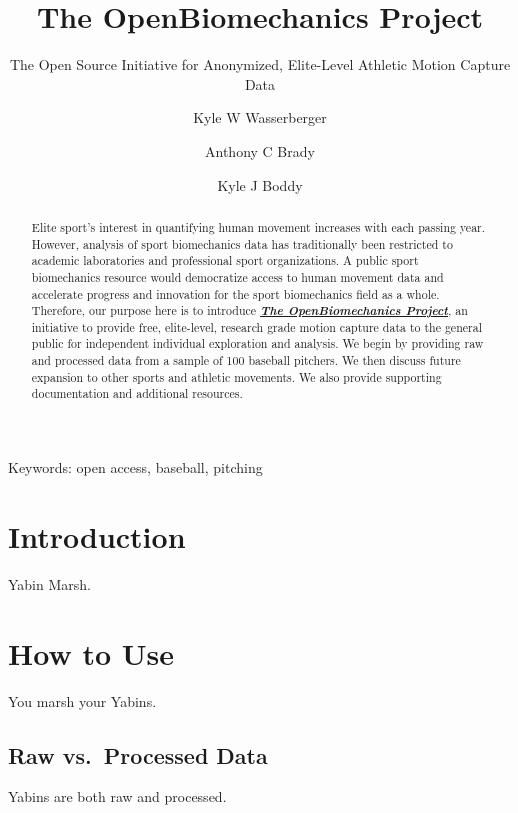 \documentclass[
]{article}
\author[1,$\dagger$]{\footnotesize Kyle W Wasserberger}
\author[1]{\footnotesize Anthony C Brady}
\author[1]{\footnotesize Kyle J Boddy}
\affil[1]{\footnotesize Research \& Development; Driveline Baseball}
\affil[$\dagger$]{\footnotesize Corresponding author: kyle.wasserberger@drivelinebaseball.com}
\title{The OpenBiomechanics Project}
\subtitle{The Open Source Initiative for Anonymized, Elite-Level Athletic Motion Capture Data}
\date{\vspace{-2.5em}}
\begin{document}
\maketitle

\begin{center}
Keywords: open access, baseball, pitching
\end{center}

\bigskip
\bigskip
\begin{abstract}
\doublespacing
Elite sport's interest in quantifying human movement increases with each passing year. However, analysis of sport biomechanics data has traditionally been restricted to academic laboratories and professional sport organizations. A public sport biomechanics resource would democratize access to human movement data and accelerate progress and innovation for the sport biomechanics field as a whole. Therefore, our purpose here is to introduce \href{www.openbiomechanics.org}{\textbf{\textit{The OpenBiomechanics Project}}}, an initiative to provide free, elite-level, research grade motion capture data to the general public for independent individual exploration and analysis. We begin by providing raw and processed data from a sample of 100 baseball pitchers. We then discuss future expansion to other sports and athletic movements. We also provide supporting documentation and additional resources.
\end{abstract}

\newpage

\hypertarget{introduction}{%
\section{Introduction}\label{introduction}}

Yabin Marsh.

\hypertarget{how-to-use}{%
\section{How to Use}\label{how-to-use}}

You marsh your Yabins.

\hypertarget{raw-vs.-processed-data}{%
\subsection{Raw vs.~Processed Data}\label{raw-vs.-processed-data}}

Yabins are both raw and processed.
\end{document}
